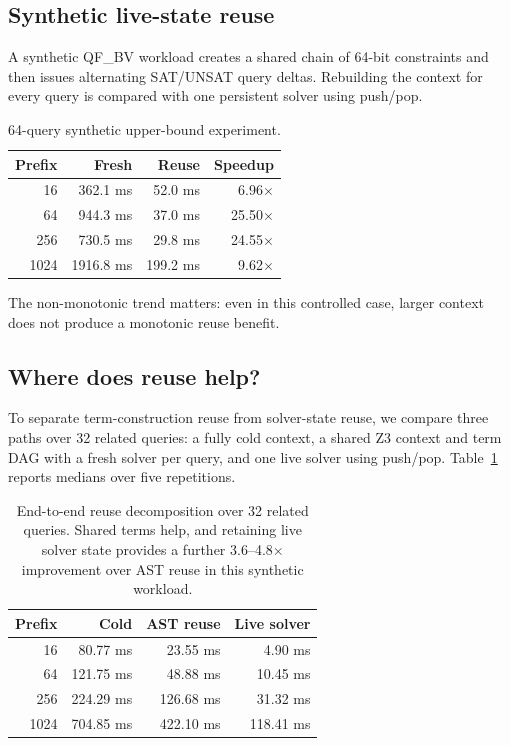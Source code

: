 \documentclass[10pt,twocolumn]{article}
\begin{document}
\subsection{Synthetic live-state reuse}
A synthetic QF\_BV workload creates a shared chain of 64-bit constraints and then issues alternating SAT/UNSAT query deltas. Rebuilding the context for every query is compared with one persistent solver using push/pop.
\begin{table}[t]
\centering\small
\begin{tabular}{rrrr}
\toprule
Prefix & Fresh & Reuse & Speedup \\
\midrule
16 & 362.1 ms & 52.0 ms & 6.96$\times$ \\
64 & 944.3 ms & 37.0 ms & 25.50$\times$ \\
256 & 730.5 ms & 29.8 ms & 24.55$\times$ \\
1024 & 1916.8 ms & 199.2 ms & 9.62$\times$ \\
\bottomrule
\end{tabular}
\caption{64-query synthetic upper-bound experiment.}
\end{table}
The non-monotonic trend matters: even in this controlled case, larger context does not produce a monotonic reuse benefit.

\subsection{Where does reuse help?}
To separate term-construction reuse from solver-state reuse, we compare three
paths over 32 related queries: a fully cold context, a shared Z3 context and
term DAG with a fresh solver per query, and one live solver using push/pop.
Table~\ref{tab:reuse-levels} reports medians over five repetitions.

\begin{table}[t]
\centering\small
\begin{tabular}{rrrr}
\toprule
Prefix & Cold & AST reuse & Live solver \\
\midrule
16 & 80.77 ms & 23.55 ms & 4.90 ms \\
64 & 121.75 ms & 48.88 ms & 10.45 ms \\
256 & 224.29 ms & 126.68 ms & 31.32 ms \\
1024 & 704.85 ms & 422.10 ms & 118.41 ms \\
\bottomrule
\end{tabular}
\caption{End-to-end reuse decomposition over 32 related queries. Shared terms
help, and retaining live solver state provides a further 3.6--4.8$\times$
improvement over AST reuse in this synthetic workload.}
\label{tab:reuse-levels}
\end{table}
\end{document}
